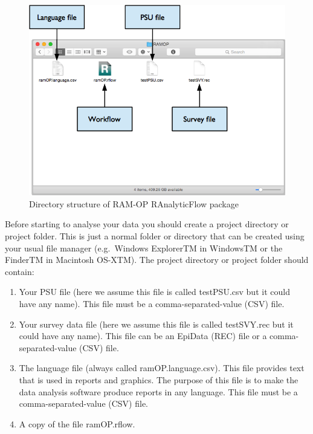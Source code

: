 \documentclass[12pt,a4paper]{book}
\theoremstyle{definition}
\theoremstyle{definition}
\theoremstyle{definition}
\theoremstyle{remark}
\begin{document}
\begin{figure}[H]

{\centering \includegraphics{figures/dirStructureRAF} 

}

\caption{Directory structure of RAM-OP RAnalyticFlow package}\label{fig:raf1}
\end{figure}

Before starting to analyse your data you should create a project
directory or project folder. This is just a normal folder or directory
that can be created using your usual file manager (e.g.~Windows
ExplorerTM in WindowsTM or the FinderTM in Macintosh OS-XTM). The
project directory or project folder should contain:

\begin{enumerate}
\def\labelenumi{\arabic{enumi}.}
\item
  Your PSU file (here we assume this file is called testPSU.csv but it
  could have any name). This file must be a comma-separated-value (CSV)
  file.
\item
  Your survey data file (here we assume this file is called testSVY.rec
  but it could have any name). This file can be an EpiData (REC) file or
  a comma-separated-value (CSV) file.
\item
  The language file (always called ramOP.language.csv). This file
  provides text that is used in reports and graphics. The purpose of
  this file is to make the data analysis software produce reports in any
  language. This file must be a comma-separated-value (CSV) file.
\item
  A copy of the file ramOP.rflow.
\end{enumerate}
\end{document}
